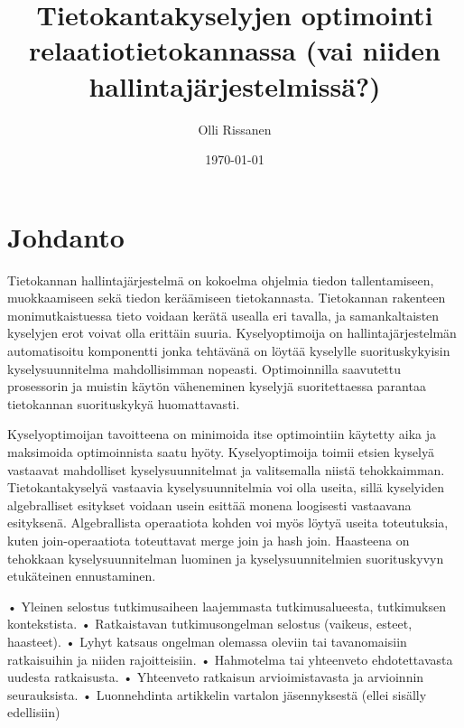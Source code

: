 \documentclass[finnish]{tktltiki2}
\title{Tietokantakyselyjen optimointi relaatiotietokannassa (vai niiden hallintajärjestelmissä?)}
\author{Olli Rissanen}
\date{\today}
\theoremstyle{definition}
\theoremstyle{remark}
\begin{document}

\maketitle        %
\makeabstract     %

\tableofcontents  %
\newpage          %



\section{Johdanto}

Tietokannan hallintajärjestelmä on kokoelma ohjelmia tiedon tallentamiseen, muokkaamiseen sekä tiedon keräämiseen tietokannasta. Tietokannan rakenteen monimutkaistuessa tieto voidaan kerätä usealla eri tavalla, ja samankaltaisten kyselyjen erot voivat olla erittäin suuria. Kyselyoptimoija on hallintajärjestelmän automatisoitu komponentti jonka tehtävänä on löytää kyselylle suorituskykyisin kyselysuunnitelma mahdollisimman nopeasti. Optimoinnilla saavutettu prosessorin ja muistin käytön väheneminen kyselyjä suoritettaessa parantaa tietokannan suorituskykyä huomattavasti.

Kyselyoptimoijan tavoitteena on minimoida itse optimointiin käytetty aika ja maksimoida optimoinnista saatu hyöty. Kyselyoptimoija toimii etsien kyselyä vastaavat mahdolliset kyselysuunnitelmat ja valitsemalla niistä tehokkaimman. Tietokantakyselyä vastaavia kyselysuunnitelmia voi olla useita, sillä kyselyiden algebralliset esitykset voidaan usein esittää monena loogisesti vastaavana esityksenä. Algebrallista operaatiota kohden voi myös löytyä useita toteutuksia, kuten join-operaatiota toteuttavat merge join ja hash join.  Haasteena on tehokkaan kyselysuunnitelman luominen ja kyselysuunnitelmien suorituskyvyn etukäteinen ennustaminen. 




• Yleinen selostus tutkimusaiheen laajemmasta tutkimusalueesta,
tutkimuksen kontekstista.
• Ratkaistavan tutkimusongelman selostus (vaikeus, esteet, haasteet).
• Lyhyt katsaus ongelman olemassa oleviin tai tavanomaisiin ratkaisuihin ja niiden rajoitteisiin.
• Hahmotelma tai yhteenveto ehdotettavasta uudesta ratkaisusta.
• Yhteenveto ratkaisun arvioimistavasta ja arvioinnin seurauksista.
• Luonnehdinta artikkelin vartalon jäsennyksestä (ellei sisälly edellisiin)
\end{document}
